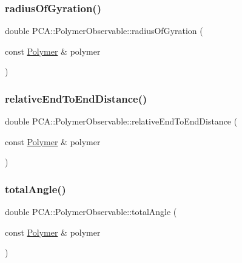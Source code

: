 \subsubsection{\texorpdfstring{radius\+Of\+Gyration()}{radiusOfGyration()}}
{\footnotesize\ttfamily double P\+C\+A\+::\+Polymer\+Observable\+::radius\+Of\+Gyration (\begin{DoxyParamCaption}\item[{const \hyperlink{class_p_c_a_1_1_polymer}{Polymer} \&}]{polymer }\end{DoxyParamCaption})\hspace{0.3cm}{\ttfamily [static]}}

\hypertarget{class_p_c_a_1_1_polymer_observable_a72ff49d3aed6660b0bd7a8175f3b436e}{}\label{class_p_c_a_1_1_polymer_observable_a72ff49d3aed6660b0bd7a8175f3b436e} 
\subsubsection{\texorpdfstring{relative\+End\+To\+End\+Distance()}{relativeEndToEndDistance()}}
{\footnotesize\ttfamily double P\+C\+A\+::\+Polymer\+Observable\+::relative\+End\+To\+End\+Distance (\begin{DoxyParamCaption}\item[{const \hyperlink{class_p_c_a_1_1_polymer}{Polymer} \&}]{polymer }\end{DoxyParamCaption})\hspace{0.3cm}{\ttfamily [static]}}

\hypertarget{class_p_c_a_1_1_polymer_observable_ae5b2dbf1d87aa54347f2a66bfb24e78b}{}\label{class_p_c_a_1_1_polymer_observable_ae5b2dbf1d87aa54347f2a66bfb24e78b} 
\subsubsection{\texorpdfstring{total\+Angle()}{totalAngle()}}
{\footnotesize\ttfamily double P\+C\+A\+::\+Polymer\+Observable\+::total\+Angle (\begin{DoxyParamCaption}\item[{const \hyperlink{class_p_c_a_1_1_polymer}{Polymer} \&}]{polymer }\end{DoxyParamCaption})\hspace{0.3cm}{\ttfamily [static]}}


